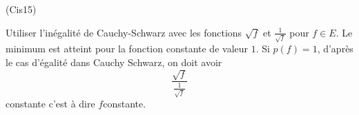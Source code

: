 \begin{tiny}(Cis15)\end{tiny} Utiliser l'inégalité de Cauchy-Schwarz avec les fonctions $\sqrt{f}$ et $\frac{1}{\sqrt{f}}$ pour $f\in E$. Le minimum est atteint pour la fonction constante de valeur $1$. Si $p(f)=1$, d'après le cas d'égalité dans Cauchy Schwarz, on doit avoir 
\[
 \frac{\sqrt{f}}{\frac{1}{\sqrt{f}}}
\]
constante c'est à dire $f$constante.